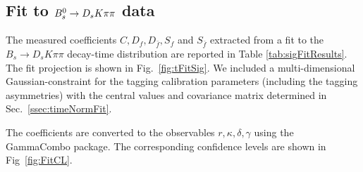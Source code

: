 \subsection{Fit to ${{B}^0_{s}}\rightarrow{\ensuremath{{D}_{s}}}{\ensuremath{K}}{\ensuremath{\pi}}{\ensuremath{\pi}}$ data}
\label{ssec:timeFit}

%
%

The measured \CP coefficients $C,D_{f},D_{\bar{f}},S_{f} $ and $S_{\bar{f}}$ extracted from a 
fit to the $B_s \to D_s K \pi\pi$ decay-time distribution are reported in Table \ref{tab:sigFitResults}.
The fit projection is shown in Fig.~\ref{fig:tFitSig}.
We included a multi-dimensional Gaussian-constraint for the tagging calibration parameters (including the tagging asymmetries) with the central values and covariance matrix determined in Sec.~\ref{ssec:timeNormFit}.

The \CP coefficients are converted to the observables $r,\kappa,\delta,\gamma$ using the GammaCombo package.
The corresponding confidence levels  are shown in Fig~\ref{fig:FitCL}.

